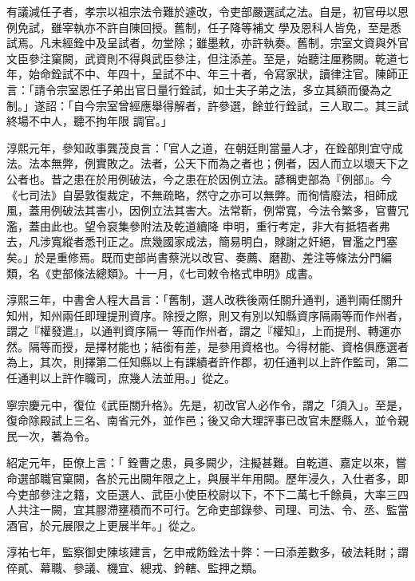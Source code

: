 \begin{pinyinscope}
 有議減任子者，孝宗以祖宗法令難於遽改，令吏部嚴選試之法。自是，初官毋以恩例免試，雖宰執亦不許自陳回授。舊制，任子降等補文
 學及恩科人皆免，至是悉試焉。凡未經銓中及呈試者，勿堂除；雖墨敕，亦許執奏。舊制，宗室文資與外官文臣參注窠闕，武資則不得與武臣參注，但注添差。至是，始聽注厘務闕。乾道七年，始命銓試不中、年四十，呈試不中、年三十者，令寫家狀，讀律注官。陳師正言：「請令宗室恩任子弟出官日量行銓試，如士夫子弟之法，多立其額而優為之制。」遂詔：「自今宗室曾經應舉得解者，許參選，餘並行銓試，三人取二。其三試終場不中人，聽不拘年限
 調官。」



 淳熙元年，參知政事龔茂良言：「官人之道，在朝廷則當量人才，在銓部則宜守成法。法本無弊，例實敗之。法者，公天下而為之者也；例者，因人而立以壞天下之公者也。昔之患在於用例破法，今之患在於因例立法。諺稱吏部為『例部』。今《七司法》自晏敦復裁定，不無疏略，然守之亦可以無弊。而徇情廢法，相師成風，蓋用例破法其害小，因例立法其害大。法常靳，例常寬，今法令繁多，官曹冗濫，蓋由此也。望令裒集參附法及乾道續降
 申明，重行考定，非大有抵牾者弗去，凡涉寬縱者悉刊正之。庶幾國家成法，簡易明白，賕謝之奸絕，冒濫之門塞矣。」於是重修焉。既而吏部尚書蔡洸以改官、奏薦、磨勘、差注等條法分門編類，名《吏部條法總類》。十一月，《七司敕令格式申明》成書。



 淳熙三年，中書舍人程大昌言：「舊制，選人改秩後兩任關升通判，通判兩任關升知州，知州兩任即理提刑資序。除授之際，則又有別以知縣資序隔兩等而作州者，謂之『權發遣』，以通判資序隔一
 等而作州者，謂之『權知』，上而提刑、轉運亦然。隔等而授，是擇材能也；結銜有差，是參用資格也。今得材能、資格俱應選者為上，其次，則擇第二任知縣以上有課績者許作郡，初任通判以上許作監司，第二任通判以上許作職司，庶幾人法並用。」從之。



 寧宗慶元中，復位《武臣關升格》。先是，初改官人必作令，謂之「須入」。至是，復命除殿試上三名、南省元外，並作邑；後又命大理評事已改官未歷縣人，並令親民一次，著為令。



 紹定元年，臣僚上言：「
 銓曹之患，員多闕少，注擬甚難。自乾道、嘉定以來，嘗命選部職官窠闕，各於元出闕年限之上，與展半年用闕。歷年浸久，入仕者多，即今吏部參注之籍，文臣選人、武臣小使臣校尉以下，不下二萬七千餘員，大率三四人共注一闕，宜其膠滯壅積而不可行。乞命吏部錄參、司理、司法、令、丞、監當酒官，於元展限之上更展半年。」從之。



 淳祐七年，監察御史陳垓建言，乞申戒飭銓法十弊：一曰添差數多，破法耗財；謂倅貳、幕職、參議、機宜、總戎、鈐轄、監押之類。




\end{pinyinscope}
